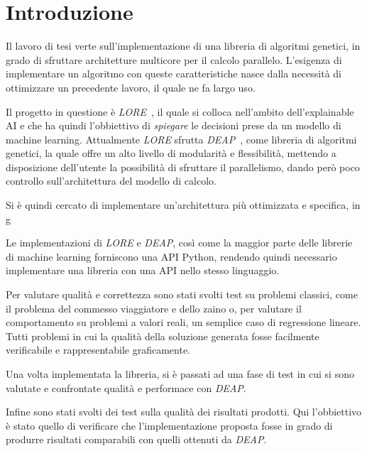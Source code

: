 \chapter*{Introduzione}

Il lavoro di tesi verte sull'implementazione di una libreria di algoritmi
genetici, in grado di sfruttare architetture multicore per il calcolo parallelo.
L'esigenza di implementare un algoritmo con queste caratteristiche nasce dalla
necessità di ottimizzare un precedente lavoro, il quale ne fa largo uso.

Il progetto in questione è \textit{LORE}~\cite{guidotti2018LORE}, il quale si
colloca nell'ambito dell'explainable AI e che ha quindi l'obbiettivo di
\textit{spiegare} le decisioni prese da un modello di machine learning.
Attualmente \textit{LORE} sfrutta \textit{DEAP}~\cite{fortin2012DEAP}, come
libreria di algoritmi genetici, la quale offre un alto livello di modularità e
flessibilità, mettendo a disposizione dell'utente la possibilità di sfruttare
il parallelismo, dando però poco controllo sull'architettura del modello di
calcolo.

Si è quindi cercato di implementare un'architettura più ottimizzata e specifica,
in g

Le implementazioni di \textit{LORE} e \textit{DEAP}, così come la maggior parte
delle librerie di machine learning forniscono una API Python, rendendo quindi
necessario implementare una libreria con una API nello stesso linguaggio.

Per valutare qualità e correttezza sono stati svolti test su problemi classici,
come il problema del commesso viaggiatore e dello zaino o, per valutare il
comportamento su problemi a valori reali, un semplice caso di regressione
lineare. Tutti problemi in cui la qualità della soluzione generata fosse
facilmente verificabile e rappresentabile graficamente.

Una volta implementata la libreria, si è passati ad una fase di test in cui
si sono valutate e confrontate qualità e performace con \textit{DEAP}.

Infine sono stati svolti dei test sulla qualità dei risultati prodotti. Qui
l'obbiettivo è stato quello di verificare che l'implementazione proposta fosse
in grado di produrre risultati comparabili con quelli ottenuti da \textit{DEAP}.
